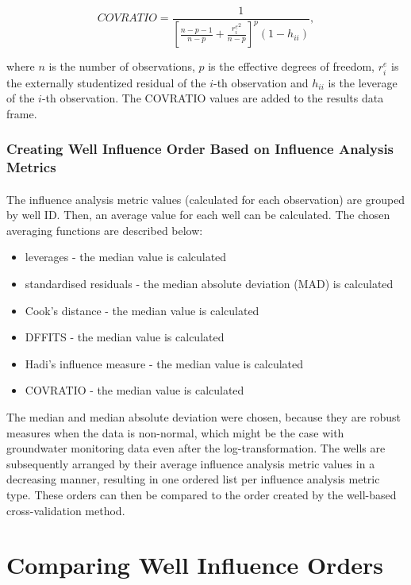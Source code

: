 \documentclass{article}
\begin{document}
\begin{equation}
    COVRATIO = \frac{1}{[\frac{n-p-1}{n-p}+\frac{{r^e_i}^2}{n-p}]^p(1-h_{ii})},
\end{equation}

where $n$ is the number of observations, $p$ is the effective degrees of freedom, $r^e_i$ is the externally studentized residual of the $i$-th observation and $h_{ii}$ is the leverage of the $i$-th observation. The COVRATIO values are added to the results data frame.

\subsubsection{Creating Well Influence Order Based on Influence Analysis Metrics}
\paragraph{}

The influence analysis metric values (calculated for each observation) are grouped by well ID. Then, an average value for each well can be calculated. The chosen averaging functions are described below:

\begin{itemize}
    \item leverages - the median value is calculated
    \item standardised residuals - the median absolute deviation (MAD) is calculated
    \item Cook's distance - the median value is calculated
    \item DFFITS - the median value is calculated
    \item Hadi's influence measure - the median value is calculated
    \item COVRATIO - the median value is calculated
\end{itemize}

The median and median absolute deviation were chosen, because they are robust measures when the data is non-normal, which might be the case with groundwater monitoring data even after the log-transformation. The wells are subsequently arranged by their average influence analysis metric values in a decreasing manner, resulting in one ordered list per influence analysis metric type. These orders can then be compared to the order created by the well-based cross-validation method.

\section{Comparing Well Influence Orders}
\end{document}
